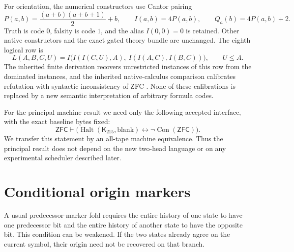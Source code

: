 \documentclass[11pt]{article}
\theoremstyle{definition}\newtheorem{definition}[theorem]{Definition}
\theoremstyle{remark}\newtheorem{remark}[theorem]{Remark}
\newcommand{\Con}{\operatorname{Con}}
\newcommand{\Halt}{\operatorname{Halt}}
\newcommand{\ZFC}{\mathsf{ZFC}}
\newcommand{\Kold}{\mathsf{K}_{215}}
\begin{document}
For orientation, the numerical constructors use Cantor pairing
\[
 P(a,b)=\frac{(a+b)(a+b+1)}2+b,
 \qquad I(a,b)=4P(a,b),\qquad Q_a(b)=4P(a,b)+2.
\]
Truth is code $0$, falsity is code $1$, and the alias $I(0,0)=0$ is retained.
Other native constructors and the exact gated theory bundle are unchanged.
The eighth logical row is
\[
 L(A,B,C,U)=I\bigl(I(I(C,U),A),\ I(I(A,C),I(B,C))\bigr),
 \qquad U\le A.
\]
The inherited finite derivation recovers unrestricted instances of this
row from the dominated instances, and the inherited native-calculus
comparison calibrates refutation with syntactic inconsistency of ZFC
\cite{dominated}. None of these calibrations is replaced by a new semantic
interpretation of arbitrary formula codes.

For the principal machine result we need only the following accepted
interface, with the exact baseline bytes fixed:
\begin{equation}\label{eq:baseline}
 \ZFC\vdash\bigl(\Halt(\Kold,\mathrm{blank})
                    \leftrightarrow\neg\Con(\ZFC)\bigr).
\end{equation}
We transfer this statement by an all-tape machine equivalence. Thus the
principal result does not depend on the new two-head language or on any
experimental scheduler described later.

\section{Conditional origin markers}
\label{sec:general}

A usual predecessor-marker fold requires the entire history of one state
to have one predecessor bit and the entire history of another state to
have the opposite bit. This condition can be weakened. If the two states
already agree on the current symbol, their origin need not be recovered
on that branch.
\end{document}
